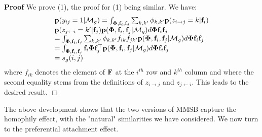 %
\noindent \textbf{Proof} We prove (1), the proof for (1) being similar. We have:
%
\begin{equation}
\begin{array}{l}
\mathbf{p}(y_{ij}=1|\mathcal{M}_g) = \int_{\mathbf{\Phi},\mathbf{f}_i,\mathbf{f}_j} \sum_{k,k'} \phi_{k,k'} \mathbf{p}(z_{i \rightarrow j}=k|\mathbf{f}_i) \nonumber \\
\mathbf{p}(z_{j \leftarrow i}=k'|\mathbf{f}_j) \mathbf{p}(\mathbf{\Phi},\mathbf{f}_i,\mathbf{f}_j|\mathcal{M}_g)  d\mathbf{\Phi}\mathbf{f}_i\mathbf{f}_j \nonumber \\
= \int_{\mathbf{\Phi},\mathbf{f}_i,\mathbf{f}_j} \sum_{k,k'} \phi_{k,k'} f_{ik} f_{jk'} \mathbf{p}(\mathbf{\Phi},\mathbf{f}_i,\mathbf{f}_j|\mathcal{M}_g)  d\mathbf{\Phi}\mathbf{f}_i\mathbf{f}_j \nonumber \\
= \int_{\mathbf{\Phi},\mathbf{f}_i,\mathbf{f}_j} \mathbf{f}_i \mathbf{\Phi} \mathbf{f}_j^\top \mathbf{p}(\mathbf{\Phi},\mathbf{f}_i,\mathbf{f}_j|\mathcal{M}_g)  d\mathbf{\Phi}\mathbf{f}_i\mathbf{f}_j \nonumber \\
= s_g(i,j) \nonumber
\end{array}
\end{equation}
%
where $f_{ik}$ denotes the element of $\mathbf{F}$ at the $i^{th}$ row and $k^{th}$ column and where the second equality stems from the definitions of $z_{i \rightarrow j}$ and $z_{j \leftarrow i}$. This leads to the desired result. \hspace{5.5cm} $\Box$

The above development shows that the two versions of MMSB capture the homophily effect, with the "natural" similarities we have considered. We now turn to the preferential attachment effect.